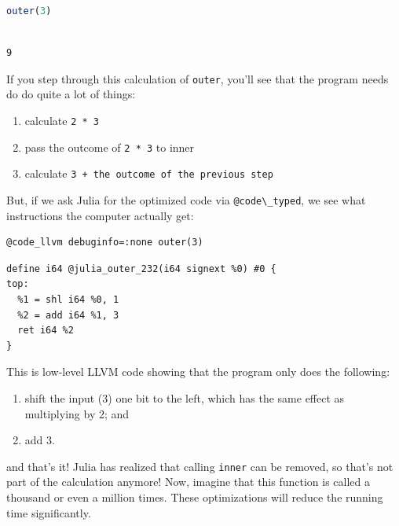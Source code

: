 \documentclass[
  notoc %
]{tufte-book}
\providecommand{\tightlist}{%
  \setlength{\itemsep}{0pt}\setlength{\parskip}{0pt}
}
\newcommand{\passthrough}[1]{#1}
\begin{document}
\begin{lstlisting}[language=Julia]
outer(3)
\end{lstlisting}

\begin{lstlisting}[language=Output]

9

\end{lstlisting}

If you step through this calculation of \passthrough{\lstinline!outer!},
you'll see that the program needs do do quite a lot of things:

\begin{enumerate}
\def\labelenumi{\arabic{enumi}.}
\tightlist
\item
  calculate \passthrough{\lstinline!2 * 3!}
\item
  pass the outcome of \passthrough{\lstinline!2 * 3!} to inner
\item
  calculate
  \passthrough{\lstinline!3 + the outcome of the previous step!}
\end{enumerate}

But, if we ask Julia for the optimized code via
\passthrough{\lstinline!@code\_typed!}, we see what instructions the
computer actually get:

\begin{lstlisting}
@code_llvm debuginfo=:none outer(3)
\end{lstlisting}

\begin{lstlisting}[language=Output]
define i64 @julia_outer_232(i64 signext %0) #0 {
top:
  %1 = shl i64 %0, 1
  %2 = add i64 %1, 3
  ret i64 %2
}
\end{lstlisting}

This is low-level LLVM code showing that the program only does the
following:

\begin{enumerate}
\def\labelenumi{\arabic{enumi}.}
\tightlist
\item
  shift the input (3) one bit to the left, which has the same effect as
  multiplying by 2; and
\item
  add 3.
\end{enumerate}

and that's it! Julia has realized that calling
\passthrough{\lstinline!inner!} can be removed, so that's not part of
the calculation anymore! Now, imagine that this function is called a
thousand or even a million times. These optimizations will reduce the
running time significantly.
\end{document}
